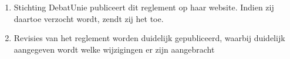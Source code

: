 
\begin{enumerate}
\item Stichting DebatUnie publiceert dit reglement op haar website. Indien zij daartoe verzocht wordt, zendt zij het toe.
\item Revisies van het reglement worden duidelijk gepubliceerd, waarbij duidelijk aangegeven wordt welke wijzigingen er zijn aangebracht
\end{enumerate}